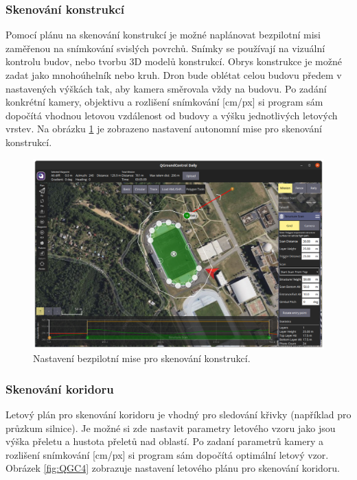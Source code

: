 \subsubsection{Skenování konstrukcí}

Pomocí plánu na skenování konstrukcí je možné naplánovat bezpilotní misi zaměřenou na snímkování svislých povrchů. Snímky se používají na vizuální kontrolu budov, nebo tvorbu 3D modelů konstrukcí. Obrys konstrukce je možné zadat jako mnohoúhelník nebo kruh. Dron bude oblétat celou budovu předem v nastavených výškách tak, aby kamera směrovala vždy na budovu. Po zadání konkrétní kamery, objektivu a rozlišení snímkování [cm/px] si program sám dopočítá vhodnou letovou vzdálenost od budovy a výšku jednotlivých letových vrstev. Na obrázku \ref{fig:QGC3} je zobrazeno nastavení autonomní mise pro skenování konstrukcí.

\begin{figure}[!ht]
    \begin{center}
        \includegraphics[scale=0.34]{obrazky/QGC5}
    \end{center}
    \caption[Nastavení bezpilotní mise pro skenování konstrukcí]{Nastavení bezpilotní mise pro skenování konstrukcí.}
    \label{fig:QGC3}
\end{figure}

\subsubsection{Skenování koridoru}

Letový plán pro skenování koridoru je vhodný pro sledování křivky (například pro průzkum silnice). Je možné si zde nastavit parametry letového vzoru jako jsou výška přeletu a hustota přeletů nad oblastí. Po zadaní parametrů kamery a rozlišení snímkování [cm/px] si program sám dopočítá optimální letový vzor. Obrázek \ref{fig:QGC4} zobrazuje nastavení letového plánu pro skenování koridoru.

